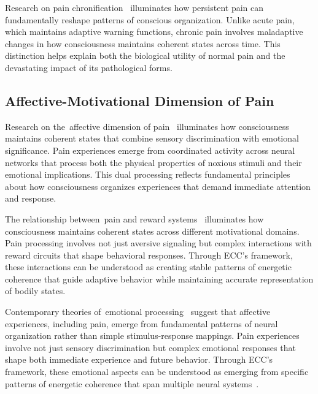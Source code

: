 Research on pain chronification~\cite{Tracey2007, zheng2025unbearable} illuminates how persistent pain can fundamentally reshape patterns of conscious organization. Unlike acute pain, which maintains adaptive warning functions, chronic pain involves maladaptive changes in how consciousness maintains coherent states across time. This distinction helps explain both the biological utility of normal pain and the devastating impact of its pathological forms.

\subsection*{Affective-Motivational Dimension of Pain}

Research on the~affective dimension of pain~\cite{Price2000, kukushkin2024massed} illuminates how consciousness maintains coherent states that combine sensory discrimination with emotional significance. Pain experiences emerge from coordinated activity across neural networks that process both the physical properties of noxious stimuli and their emotional implications. This dual processing reflects fundamental principles about how consciousness organizes experiences that demand immediate attention and response.

The relationship between~pain and reward systems~\cite{Fields2007, pinotsis2023cytoelectric} illuminates how consciousness maintains coherent states across different motivational domains. Pain processing involves not just aversive signaling but complex interactions with reward circuits that shape behavioral responses. Through ECC's framework, these interactions can be understood as creating stable patterns of energetic coherence that guide adaptive behavior while maintaining accurate representation of bodily states.

Contemporary theories of~emotional processing~\cite{Barrett2009, da2024mathematical} suggest that affective experiences, including pain, emerge from fundamental patterns of neural organization rather than simple stimulus-response mappings. Pain experiences involve not just sensory discrimination but complex emotional responses that shape both immediate experience and future behavior. Through ECC's framework, these emotional aspects can be understood as emerging from specific patterns of energetic coherence that span multiple neural systems~\cite{Price2000, amil2024theta}.

